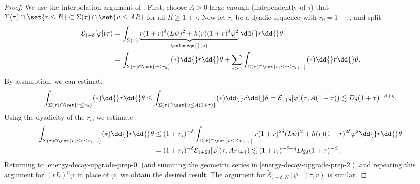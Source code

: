 \documentclass[10pt, reqno]{amsart}
\begin{document}
\begin{proof}
We use the interpolation argument of \cite[Prop.~10.6]{GAJIC2023110058}. First,
choose \(A>0\) large enough (independently of \(\tau{}\)) that
\(\Sigma{}(\tau{})\cap \set{r\le R}\subset \Sigma{}(\tau{})\cap \set{v\le AR}\)
for all \(R\ge 1 + \tau{}\). Now let \(r_i\) be a dyadic sequence with \(r_0 =
1 + \tau{}\), and split
\begin{equation}\label{energy-decay-upgrade-prep-0}
\begin{split}
\mathcal{E}_{1+\delta{}}[\varphi{}](\tau{}) &= \int _{\Sigma{}(\tau{})} \underbrace{r(1+r)^\delta{}(L\psi{})^2 + h(r)(1+r)^\delta{}\varphi{}^2}_{\coloneqq{}(\ast{})} \dd{}r\dd{}\theta{} \\
&=  \int _{\Sigma{}(\tau{})\cap \set{r\le r_0}}(\ast{})\dd{}r\dd{}\theta{} + \sum_{i\ge 0}\int _{\Sigma{}(\tau{})\cap \set{r_i\le r\le r_{i+1}}}(\ast{})\dd{}r\dd{}\theta{}.
\end{split}
\end{equation}
By assumption, we can estimate
\begin{equation}\label{energy-decay-upgrade-prep}
\int _{\Sigma{}(\tau{})\cap \set{r\le r_0}}(\ast{})\dd{}r\dd{}\theta{} \le \int _{\Sigma{}(\tau{})\cap \set{v\le A(1+\tau{})}}(\ast{})\dd{}r\dd{}\theta{} = \mathcal{E}_{1+\delta{}}[\varphi{}](\tau{},A(1+\tau{}))\lesssim D_\delta{}(1+\tau{})^{-\beta{}+\eta{}}.
\end{equation}
Using the dyadicity of the \(r_i\), we estimate
\begin{equation}\label{energy-decay-upgrade-prep-2}
\begin{split}
\int _{\Sigma{}(\tau{})\cap \set{r_i\le r\le r_{i+1}}} (\ast{})\dd{}r\dd{}\theta{}&\le (1+r_i)^{-\delta{}}\int _{\Sigma{}(\tau{})\cap \set{v\le Ar_{i+1}}}r(1+r)^{2\delta{}}(L\psi{})^2 + h(r)(1+r)^{2\delta{}}\varphi{}^2\dd{}r\dd{}\theta{}\\
&=(1+r_i)^{-\delta{}}\mathcal{E}_{1+2\delta{}}[\varphi{}](\tau{},Ar_{i+1})\lesssim (1+r_i)^{-\delta{}+\eta{}}D_{2\delta{}}(1+\tau{})^{-\beta{}}.
\end{split}
\end{equation}
Returning to \cref{energy-decay-upgrade-prep-0} (and summing the geometric series
in \cref{energy-decay-upgrade-prep-2}), and repeating this argument for
\((rL)^n\varphi{}\) in place of \(\varphi{}\), we obtain the desired result. The
argument for \(\tilde{\mathcal{E}}_{1 + \delta{},N}[\psi{}](\tau{},v)\) is similar.
\end{proof}
\end{document}

